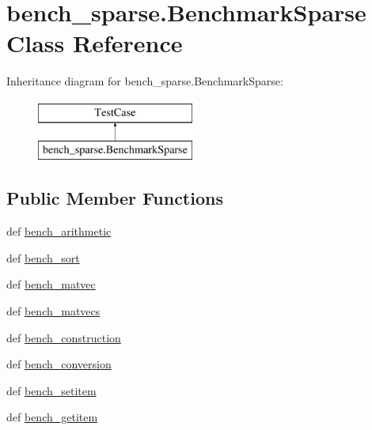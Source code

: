\hypertarget{classbench__sparse_1_1BenchmarkSparse}{}\section{bench\+\_\+sparse.\+Benchmark\+Sparse Class Reference}
\label{classbench__sparse_1_1BenchmarkSparse}
Inheritance diagram for bench\+\_\+sparse.\+Benchmark\+Sparse\+:\begin{figure}[H]
\begin{center}
\leavevmode
\includegraphics[height=2.000000cm]{classbench__sparse_1_1BenchmarkSparse}
\end{center}
\end{figure}
\subsection*{Public Member Functions}
\begin{DoxyCompactItemize}
\item 
def \hyperlink{classbench__sparse_1_1BenchmarkSparse_a494b5d1fcf21c6b5640f940f0b6f0280}{bench\+\_\+arithmetic}
\item 
def \hyperlink{classbench__sparse_1_1BenchmarkSparse_ada7415f504fc912b3d6dfdb246c341da}{bench\+\_\+sort}
\item 
def \hyperlink{classbench__sparse_1_1BenchmarkSparse_a16e535a4173c4d62f1e85ad82d9d46a4}{bench\+\_\+matvec}
\item 
def \hyperlink{classbench__sparse_1_1BenchmarkSparse_a19e4de610dff40bd0283cdbfaf13f2a3}{bench\+\_\+matvecs}
\item 
def \hyperlink{classbench__sparse_1_1BenchmarkSparse_ad83c0fd0240f091e7fc99a3dbf6909c5}{bench\+\_\+construction}
\item 
def \hyperlink{classbench__sparse_1_1BenchmarkSparse_a28aa7f482e2f882767fc83e075a6884f}{bench\+\_\+conversion}
\item 
def \hyperlink{classbench__sparse_1_1BenchmarkSparse_a432a92f16c20ec212085739c92f18690}{bench\+\_\+setitem}
\item 
def \hyperlink{classbench__sparse_1_1BenchmarkSparse_a98825af9a6676673e4c5e541101281ff}{bench\+\_\+getitem}
\end{DoxyCompactItemize}


